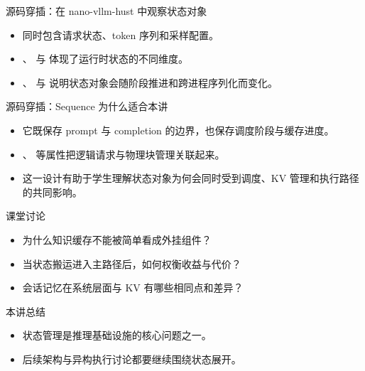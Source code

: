 \begin{frame}{源码穿插：在 nano-vllm-hust 中观察状态对象}
  \begin{itemize}
    \item \texttt{} 同时包含请求状态、token 序列和采样配置。
    \item \texttt{}、\texttt{} 与 \texttt{} 体现了运行时状态的不同维度。
    \item \texttt{}、\texttt{} 与 \texttt{} 说明状态对象会随阶段推进和跨进程序列化而变化。
  \end{itemize}
\end{frame}

\begin{frame}{源码穿插：Sequence 为什么适合本讲}
  \begin{itemize}
    \item 它既保存 prompt 与 completion 的边界，也保存调度阶段与缓存进度。
    \item \texttt{}、\texttt{} 等属性把逻辑请求与物理块管理关联起来。
    \item 这一设计有助于学生理解状态对象为何会同时受到调度、KV 管理和执行路径的共同影响。
  \end{itemize}
\end{frame}



\begin{frame}{课堂讨论}
  \begin{itemize}
    \item 为什么知识缓存不能被简单看成外挂组件？
    \item 当状态搬运进入主路径后，如何权衡收益与代价？
    \item 会话记忆在系统层面与 KV 有哪些相同点和差异？
  \end{itemize}
\end{frame}

\begin{frame}{本讲总结}
  \begin{itemize}
    \item 状态管理是推理基础设施的核心问题之一。
    \item 后续架构与异构执行讨论都要继续围绕状态展开。
  \end{itemize}
\end{frame}

